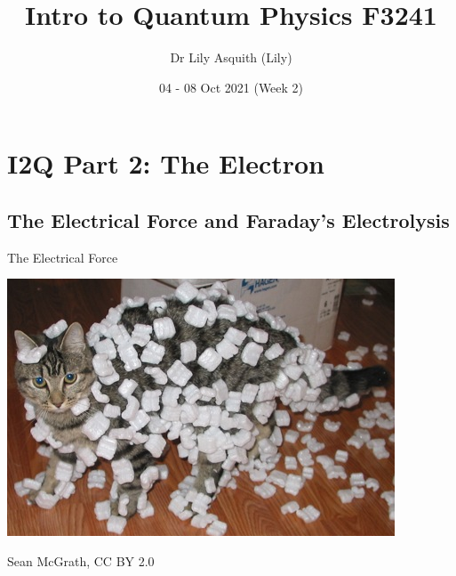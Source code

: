 


% 
\title[ Intro to Quantum Physics]{Intro to Quantum Physics F3241}
\author[Dr Lily Asquith (Lily)]{ Dr Lily Asquith (Lily)}
\date[04 - 08 Oct 2021]{ 04 - 08 Oct 2021 (Week 2)}





\begin{frame}
\titlepage
\end{frame} 

\section{I2Q Part 2: The Electron}

 
 
 \subsection{The Electrical Force and Faraday's Electrolysis}



%  
\begin{frame}{The Electrical Force}
\small

\begin{center}
\includegraphics[scale=1]{cat.jpg}
\end{center}
\tiny
Sean McGrath,  CC BY 2.0 
\end{frame}

